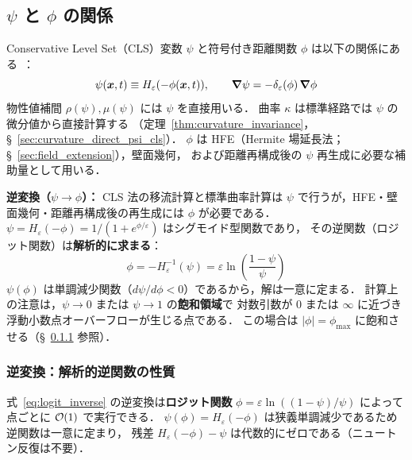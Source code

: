 %
%
\subsection{\texorpdfstring{$\psi$}{ψ} と \texorpdfstring{$\phi$}{φ} の関係}
\label{sec:levelset_mapping}

\begin{tcolorbox}[defbox, title={$\psi$--$\phi$ 対応付けと解析的逆変換（ロジット関数）}]
Conservative Level Set（CLS）変数 $\psi$ と符号付き距離関数 $\phi$ は以下の関係にある~\cite{OlssonKreiss2005, Desjardins2008}：
\begin{equation}
  \psi(\bm{x},t) \equiv H_\varepsilon(-\phi(\bm{x},t)), \qquad
  \bm{\nabla}\psi = -\delta_\varepsilon(\phi)\,\bm{\nabla}\phi
\end{equation}
物性値補間 $\rho(\psi), \mu(\psi)$ には $\psi$ を直接用いる．
曲率 $\kappa$ は標準経路では $\psi$ の微分値から直接計算する
（定理~\ref{thm:curvature_invariance}，§~\ref{sec:curvature_direct_psi_cls}）．
$\phi$ は HFE（Hermite 場延長法；§~\ref{sec:field_extension}），壁面幾何，
および距離再構成後の $\psi$ 再生成に必要な補助量として用いる．

\medskip
\textbf{逆変換（$\psi \to \phi$）：}
CLS 法の移流計算と標準曲率計算は $\psi$ で行うが，HFE・壁面幾何・距離再構成後の再生成には $\phi$ が必要である．
$\psi=H_\varepsilon(-\phi)=1/(1+e^{\phi/\varepsilon})$ はシグモイド型関数であり，
その逆関数（ロジット関数）は\textbf{解析的に求まる}：
\begin{equation}
  \phi = -H_\varepsilon^{-1}(\psi) = \varepsilon\ln\!\left(\frac{1-\psi}{\psi}\right)
  \label{eq:logit_inverse}
\end{equation}
$\psi(\phi)$ は単調減少関数（$d\psi/d\phi < 0$）であるから，解は一意に定まる．
計算上の注意は，$\psi \to 0$ または $\psi \to 1$ の\textbf{飽和領域}で
対数引数が $0$ または $\infty$ に近づき浮動小数点オーバーフローが生じる点である．
この場合は $|\phi| = \phi_{\max}$ に飽和させる（§~\ref{sec:newton_inversion} 参照）．
\end{tcolorbox}

\subsubsection{逆変換：解析的逆関数の性質}
\label{sec:newton_inversion}

式~\eqref{eq:logit_inverse} の逆変換は\textbf{ロジット関数}
$\phi = \varepsilon\ln((1-\psi)/\psi)$
によって点ごとに $\mathcal{O}(1)$ で実行できる．
$\psi(\phi)=H_\varepsilon(-\phi)$ は狭義単調減少であるため逆関数は一意に定まり，
残差 $H_\varepsilon(-\phi) - \psi$ は代数的にゼロである（ニュートン反復は不要）．

